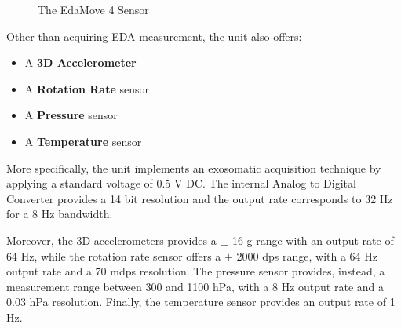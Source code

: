 \begin{figure}[htp]
    \centering
    \hfill%
    \caption{The EdaMove 4 Sensor}
\end{figure}

Other than acquiring EDA measurement, the unit also offers:

\begin{itemize}
    \item A \textbf{3D Accelerometer}
    \item A \textbf{Rotation Rate} sensor
    \item A \textbf{Pressure} sensor
    \item A \textbf{Temperature} sensor
\end{itemize}

More specifically, the unit implements an exosomatic acquisition technique by applying a standard voltage of 0.5 V DC. The internal Analog to Digital Converter provides a 14 bit resolution and the output rate corresponds to 32 Hz for a 8 Hz bandwidth.

Moreover, the 3D accelerometers provides a $\pm$ 16 g range with an output rate of 64 Hz, while the rotation rate sensor offers a $\pm$ 2000 dps range, with a 64 Hz output rate and a 70 mdps resolution. The pressure sensor provides, instead, a measurement range between 300 and 1100 hPa, with a 8 Hz output rate and a 0.03 hPa resolution. Finally, the temperature sensor provides an output rate of 1 Hz.

